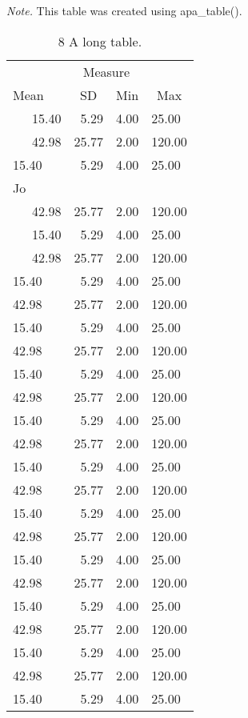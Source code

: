 \documentclass[man]{apa6}
\makeatletter
\newcommand\LastLTentrywidth{1em}
\newlength\longtablewidth
\newcommand{\getlongtablewidth}{\begingroup \ifcsname LT@\roman{LT@tables}\endcsname \global\longtablewidth=0pt \renewcommand{\LT@entry}[2]{\global\advance\longtablewidth by ##2\relax\gdef\LastLTentrywidth{##2}}\@nameuse{LT@\roman{LT@tables}} \fi \endgroup}
\makeatother
\begin{document}
\begin{center}
\begin{ThreePartTable}
\begin{TableNotes}[para]
\normalsize{\textit{Note.} This table was created using apa\_table().}
\end{TableNotes}
\begin{longtable}{lrrl}\noalign{\getlongtablewidth\global\LTcapwidth=\longtablewidth}
\caption{\label{tab:unnamed-chunk-8}8 A long table.}\\
\toprule
 & \multicolumn{2}{c}{Measure}  &\\
\cmidrule(r){2-3}
Mean & \multicolumn{1}{c}{SD} & \multicolumn{1}{c}{Min} & \multicolumn{1}{c}{Max}\\
\midrule
\ \ \ 15.40 & 5.29 & 4.00 & 25.00\\
\ \ \ 42.98 & 25.77 & 2.00 & 120.00\\
15.40 & 5.29 & 4.00 & 25.00\\
Jo &  &  & \\ \midrule
\ \ \ 42.98 & 25.77 & 2.00 & 120.00\\
\ \ \ 15.40 & 5.29 & 4.00 & 25.00\\
\ \ \ 42.98 & 25.77 & 2.00 & 120.00\\
15.40 & 5.29 & 4.00 & 25.00\\
42.98 & 25.77 & 2.00 & 120.00\\
15.40 & 5.29 & 4.00 & 25.00\\
42.98 & 25.77 & 2.00 & 120.00\\
15.40 & 5.29 & 4.00 & 25.00\\
42.98 & 25.77 & 2.00 & 120.00\\
15.40 & 5.29 & 4.00 & 25.00\\
42.98 & 25.77 & 2.00 & 120.00\\
15.40 & 5.29 & 4.00 & 25.00\\
42.98 & 25.77 & 2.00 & 120.00\\
15.40 & 5.29 & 4.00 & 25.00\\
42.98 & 25.77 & 2.00 & 120.00\\
15.40 & 5.29 & 4.00 & 25.00\\
42.98 & 25.77 & 2.00 & 120.00\\
15.40 & 5.29 & 4.00 & 25.00\\
42.98 & 25.77 & 2.00 & 120.00\\
15.40 & 5.29 & 4.00 & 25.00\\
42.98 & 25.77 & 2.00 & 120.00\\
15.40 & 5.29 & 4.00 & 25.00\\

\end{longtable}
\end{ThreePartTable}
\end{center}
\end{document}
